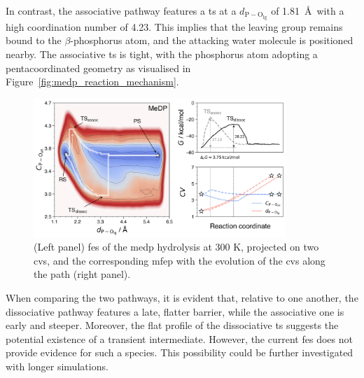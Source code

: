 In contrast, the associative pathway features a \ac{ts} at a $d_\mathrm{P-O_{\mathrm{lg}}}$ of 1.81~\AA\ with a high coordination number of 4.23. This implies that the leaving group remains bound to the $\beta$-phosphorus atom, and the attacking water molecule is positioned nearby. The associative \ac{ts} is tight, with the phosphorus atom adopting a pentacoordinated geometry as visualised in Figure~\ref{fig:medp_reaction_mechanism}.

\begin{figure}[b!]
    \centering
    \includegraphics[width=0.85\textwidth]{Figures/4_Results/results_MeDP_300K_fes_mfep.png}
    \caption{(Left panel) \ac{fes} of the \ac{medp} hydrolysis at 300 K, projected on two \acp{cv}, and the corresponding \ac{mfep} with the evolution of the \acp{cv} along the path (right panel).}
    \label{fig:medp_300k_fes_mfep}
\end{figure}

When comparing the two pathways, it is evident that, relative to one another, the dissociative pathway features a late, flatter barrier, while the associative one is early and steeper. Moreover, the flat profile of the dissociative \ac{ts} suggests the potential existence of a transient intermediate. However, the current \ac{fes} does not provide evidence for such a species. This possibility could be further investigated with longer simulations.

